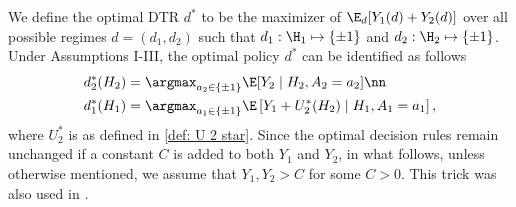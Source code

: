\documentclass[preprint] {imsart}
\begin{document}
{\color{black} We\label{page: d star def} define the optimal DTR $d^*$ to be the maximizer of $\E_d [Y_1(d)+Y_2(d)]$ over all possible regimes $d=(d_1,d_2)$ such that $d_1:\H_1\mapsto\{\pm 1\}$ and $d_2:\H_2\mapsto \{\pm 1\}$. } Under Assumptions I-III, the optimal policy $d^*$ can be identified as follows \citep{zhao2015,chakraborty2013}
\begin{align}\label{def: d1 and d2 star}
d_2^*(H_2)&=\argmax_{a_2\in\{\pm 1\}}\E[Y_2\mid  H_2,A_2=a_2]\nn\\
d_1^*(H_1)&=\argmax_{a_1\in\{\pm 1\}}\E\left[ Y_1+ U_2^*(H_2) \mid H_1, A_1=a_1\right],
\end{align}
 where $U_2^*$ is as defined in \eqref{def: U 2 star}. 
Since the optimal decision rules
remain unchanged if a constant $C$ is added to both $Y_1$ and $Y_2$, in what follows, unless otherwise mentioned, we assume that $Y_1,Y_2>C$ for some $C>0$. 
This trick was also used in \cite{zhao2015}. 
\end{document}
